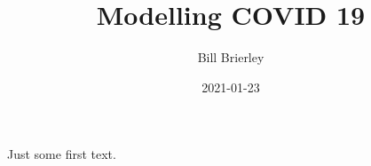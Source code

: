 
\title{Modelling COVID 19}
\author{Bill Brierley}
\date{2021-01-23}

\usepackage{amsmath}


    \maketitle
    Just some first text.


